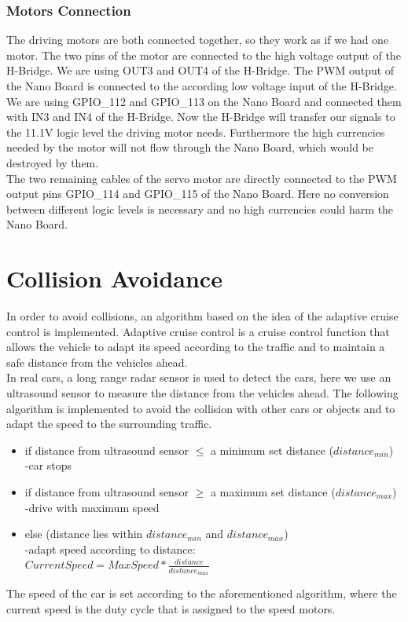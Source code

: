 \documentclass[11pt,twocolumn]{article}
\begin{document}
\subsubsection{Motors Connection}
The driving motors are both connected together, so they work as if we had one motor. The two pins of the motor are connected to the high voltage output of the H-Bridge. We are using OUT3 and OUT4 of the H-Bridge. The PWM output of the Nano Board is connected to the according low voltage input of the H-Bridge. We are using GPIO\_112 and GPIO\_113 on the Nano Board and connected them with IN3 and IN4 of the H-Bridge. Now the H-Bridge will transfer our signals to the 11.1V logic level the driving motor needs. Furthermore the high currencies needed by the motor will not flow through the Nano Board, which would be destroyed by them.\\
The two remaining cables of the servo motor are directly connected to the PWM output pins GPIO\_114 and GPIO\_115 of the Nano Board. Here no conversion between different logic levels is necessary and no high currencies could harm the Nano Board.



\section{Collision Avoidance}
\label{Usensor}
In order to avoid collisions, an algorithm based on the idea of the adaptive cruise control is implemented. Adaptive cruise control is a cruise control function that allows the vehicle to adapt its speed according to the traffic and to maintain a safe distance from the vehicles ahead.\\
In real cars, a long range radar sensor is used to detect the cars, here we use an ultrasound sensor to measure the distance from the vehicles ahead. The following algorithm is implemented to avoid the collision with other cars or objects and to adapt the speed to the surrounding traffic.
\begin{itemize}
	\item if distance from ultrasound sensor $\leq$ a minimum set distance ($distance_{min}$)\\
	-car stops
	\item if distance from ultrasound sensor $\geq$ a maximum set distance ($distance_{max}$)\\
	 -drive with maximum speed
	\item else (distance lies within $distance_{min}$ and $distance_{max}$)\\
	 -adapt speed according to distance:\\
	 $Current Speed = MaxSpeed * \frac{distance}{distance_{max}}$
\end{itemize}
The speed of the car is set according to the aforementioned algorithm, where the current speed is the duty cycle that is assigned to the speed motors.
\end{document}
